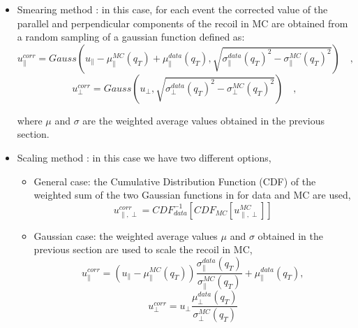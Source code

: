   \begin{itemize}
  \item Smearing method : in this case, for each event the corrected value of the parallel and perpendicular components of the recoil in MC are obtained from a random sampling of a gaussian function defined as: 
    \begin{equation}\label{eq:eqreccornsmrupar} 
        u^{corr}_{\parallel} = Gauss(u_{\parallel} - \mu_{\parallel}^{MC}(q_{T}) + \mu_{\parallel}^{data}(q_{T}), \sqrt{{\sigma_{\parallel}^{data}(q_{T})}^{2} - {\sigma_{\parallel}^{MC}(q_{T})}^{2}}) \quad,
    \end{equation}
    \begin{equation}\label{eq:eqreccornsmruperp} 
        u^{corr}_{\perp} = Gauss(u_{\perp}, \sqrt{{\sigma_{\perp}^{data}(q_{T})}^{2} - {\sigma_{\perp}^{MC}(q_{T})}^{2}}) \quad,
    \end{equation}
    
    where $\mu$ and $\sigma$ are the weighted average values obtained in the previous section.
    
    \item Scaling method :  in this case we have two different options,
    
      \begin{itemize}
       \item General case: the Cumulative Distribution Function (CDF) of the weighted sum of the two Gaussian functions in  for data and MC are used,
       \begin{equation}\label{eq:eqRecCorrGeneralCase} 
         u^{corr}_{\parallel, \perp} = CDF^{-1}_{data}[CDF_{MC}[u_{\parallel, \perp}^{MC}]]
       \end{equation}
       
       \item Gaussian case: the weighted average values $\mu$ and $\sigma$ obtained in the previous section are used to scale the recoil in MC,
       \begin{equation}\label{eq:eqreccornsclupar} 
         u^{corr}_{\parallel} = (u_{\parallel} - \mu_{\parallel}^{MC}(q_{T}))\frac{\sigma_{\parallel}^{data}(q_{T})}{\sigma_{\parallel}^{MC}(q_{T})} + \mu_{\parallel}^{data}(q_{T}),
       \end{equation}
       \begin{equation}\label{eq:eqreccornscluperp} 
         u^{corr}_{\perp} = u_{\perp}\frac{\mu_{\perp}^{data}(q_{T})}{\sigma_{\perp}^{MC}(q_{T})}
       \end{equation}
      \end{itemize}

  \end{itemize}

